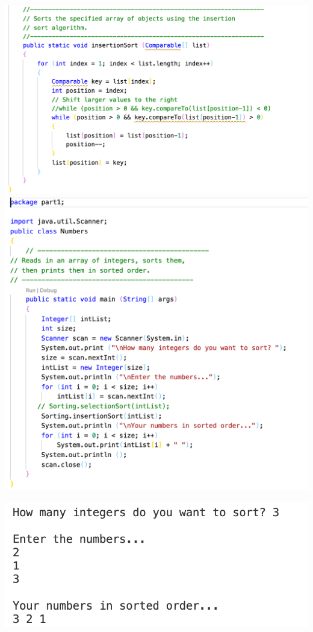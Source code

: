 \documentclass[hidelinks,12pt]{article}
\begin{document}
\includegraphics[scale=0.35]{desInsert.png} \includegraphics[scale=0.35]{newNum.png}

\includegraphics[scale=0.55]{newNumR.png}
\end{document}

